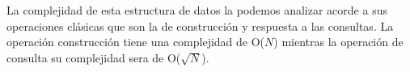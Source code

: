 La complejidad de esta estructura de datos la podemos analizar acorde a sus operaciones clásicas que son la de construcción y respuesta a las consultas. La operación construcción tiene una complejidad de O($N$) mientras la operación de consulta su complejidad sera de O($\sqrt{N}$). 